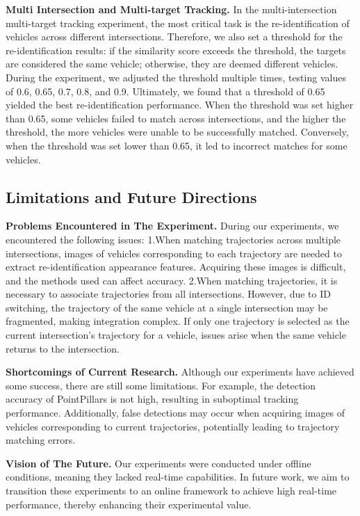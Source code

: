 \textbf{Multi Intersection and Multi-target Tracking.}
In the multi-intersection multi-target tracking experiment, the most critical task is the re-identification of vehicles across different intersections. 
Therefore, we also set a threshold for the re-identification results: if the similarity score exceeds the threshold, the targets are considered the same vehicle; otherwise, they are deemed different vehicles. 
During the experiment, we adjusted the threshold multiple times, testing values of 0.6, 0.65, 0.7, 0.8, and 0.9. 
Ultimately, we found that a threshold of 0.65 yielded the best re-identification performance. 
When the threshold was set higher than 0.65, some vehicles failed to match across intersections, and the higher the threshold, the more vehicles were unable to be successfully matched. 
Conversely, when the threshold was set lower than 0.65, it led to incorrect matches for some vehicles.

\subsection{Limitations and Future Directions}

\textbf{Problems Encountered in The Experiment.}
During our experiments, we encountered the following issues:  
1.When matching trajectories across multiple intersections, images of vehicles corresponding to each trajectory are needed to extract re-identification appearance features. 
Acquiring these images is difficult, and the methods used can affect accuracy.  
2.When matching trajectories, it is necessary to associate trajectories from all intersections. 
However, due to ID switching, the trajectory of the same vehicle at a single intersection may be fragmented, making integration complex. 
If only one trajectory is selected as the current intersection's trajectory for a vehicle, issues arise when the same vehicle returns to the intersection.

\textbf{Shortcomings of Current Research.}
Although our experiments have achieved some success, there are still some limitations. 
For example, the detection accuracy of PointPillars is not high, resulting in suboptimal tracking performance. 
Additionally, false detections may occur when acquiring images of vehicles corresponding to current trajectories, potentially leading to trajectory matching errors.

\textbf{Vision of The Future.}
Our experiments were conducted under offline conditions, meaning they lacked real-time capabilities. 
In future work, we aim to transition these experiments to an online framework to achieve high real-time performance, thereby enhancing their experimental value.